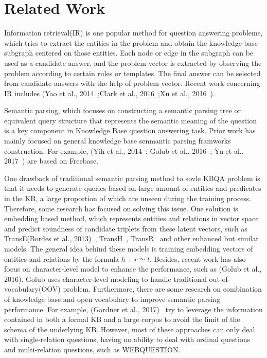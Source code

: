 \section{Related Work}

Information retrieval(IR) is one popular method for question answering problems, which tries to extract the entities in the problem and obtain the knowledge base subgraph centered on those entities. Each node or edge in the subgraph can be used as a candidate answer, and the problem vector is extracted by observing the problem according to certain rules or templates. The final answer can be selected from candidate answers with the help of problem vector. Recent work concerning IR includes (Yao et al., 2014~\cite{yao2014information};Clark et al., 2016~\cite{clark2016combining};Xu et al., 2016~\cite{xu2016question}).

Semantic parsing, which focuses on constructing a semantic parsing tree or equivalent query structure that represents the semantic meaning of the question is a key component in Knowledge Base question answering task. Prior work has mainly focused on general knowledge base senmantic parsing framworks construction. For example, (Yih et al., 2014~\cite{yih2014semantic}; Golub et al., 2016~\cite{golub2016character}; Yu et al., 2017~\cite{yu2017improved}) are based on Freebase.

One drawback of traditional semantic parsing method to sovle KBQA problem is that it needs to generate queries based on large amount of entities and predicates in the KB, a large proportion of which are unseen during the training process. Therefore, some research has focused on solving this issue. One solution is embedding based method, which represents entities and relations in vector space and predict soundness of candidate triplets from these latent vectors, such as  
TransE(Bordes et al., 2013)~\cite{bordes2013translating}, TransH~\cite{wang2014knowledge}, TransR~\cite{lin2015learning} and other enhanced but similar models. The general idea behind these models is training embedding vectors of entities and relations by the formula $h+r\simeq t$. Besides, recent work has also focus on character-level model to enhance the performance, such as (Golub et al., 2016). Golub uses character-level modeling to handle traditional out-of-vocabulary(OOV) problem. Furthermore, there are some research on combination of knowledge base and open vocabulary to improve semantic parsing performance. For example, (Gardner et al., 2017)~\cite{gardner2017open} try to leverage the information contained in both a formal KB and a large corpus to avoid the limit of the schema of the underlying KB. However, most of these approaches can only deal with single-relation questions, having no ability to deal with ordinal questions and multi-relation questions, such as WEBQUESTION. 

